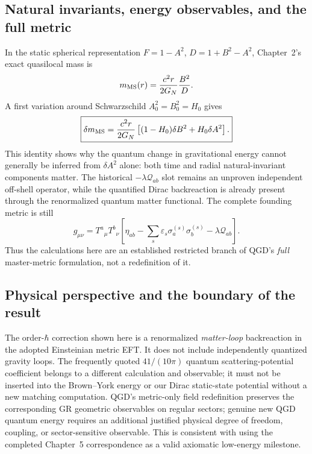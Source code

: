 \documentclass[11pt,a4paper]{article}
\theoremstyle{definition}\newtheorem{definition}[theorem]{Definition}
\theoremstyle{remark}\newtheorem{remark}[theorem]{Remark}
\begin{document}
\subsection{Natural invariants, energy observables, and the full metric}
In the static spherical representation $F=1-A^2$,
$D=1+B^2-A^2$, Chapter~2's exact
quasilocal mass is
\begin{equation}\label{eq:v15-MSAB}
 m_{\rm MS}(r)=\frac{c^2r}{2G_N}\frac{B^2}{D}.
\end{equation}
A first variation around Schwarzschild $A_0^2=B_0^2=H_0$ gives
\begin{equation}\label{eq:v15-MSvariation}
 \boxed{\delta m_{\rm MS}
 =\frac{c^2r}{2G_N}\left[(1-H_0)\delta B^2
 +H_0\delta A^2\right] .}
\end{equation}
This identity shows why the quantum change in gravitational energy
cannot generally be inferred from $\delta A^2$ alone:
both time and radial natural-invariant components matter.
The historical $-\lambda\mathcal Q_{ab}$ slot remains an unproven
independent off-shell operator, while the quantified Dirac backreaction
is already present through the renormalized quantum matter functional.
The complete founding metric is still
\begin{equation}\label{eq:v15-fullmaster}
 \boxed{g_{\mu\nu}=T^a{}_{\mu}T^b{}_{\nu}
 [\eta_{ab}-\sum_s\varepsilon_s\sigma_a^{(s)}\sigma_b^{(s)}
 -\lambda\mathcal Q_{ab}].}
\end{equation}
Thus the calculations here are an established restricted branch of
QGD's \emph{full} master-metric formulation, not a redefinition of it.

\subsection{Physical perspective and the boundary of the result}
The order-$\hbar$ correction shown here is a renormalized
\emph{matter-loop} backreaction in the adopted Einsteinian metric
EFT. It does not include independently quantized gravity loops.
The frequently quoted $41/(10\pi)$ quantum scattering-potential
coefficient belongs to a different calculation and observable; it
must not be inserted into the Brown--York energy or our Dirac
static-state potential without a new matching computation.
QGD's metric-only field redefinition preserves the corresponding
GR geometric observables on regular sectors; genuine new QGD
quantum energy requires an additional justified physical degree of
freedom, coupling, or sector-sensitive observable. This is consistent
with using the completed Chapter~5 correspondence as a valid
axiomatic low-energy milestone.
\end{document}

